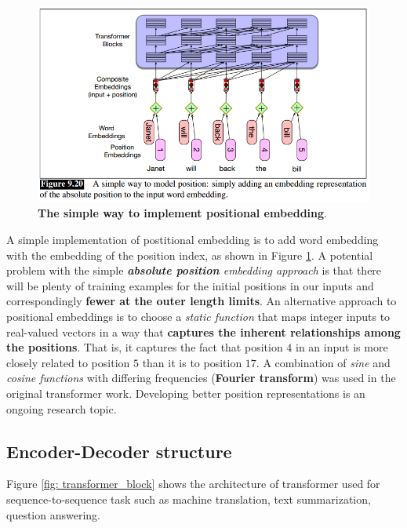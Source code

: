 \documentclass[11pt]{article}
\begin{document}
\begin{figure}
\begin{minipage}[t]{1\linewidth}
  \centering
  \centerline{\includegraphics[scale = 0.4]{pos_embedding.png}}
\end{minipage}
\caption{\footnotesize{\textbf{The simple way to implement positional embedding}.}}
\label{fig: pos_embedding}
\end{figure}

A simple implementation of postitional embedding is to add word embedding with the embedding of the position index, as shown in Figure \ref{fig: pos_embedding}. A potential problem with the simple \emph{\textbf{absolute position} embedding approach} is that there will be plenty of training examples for the initial positions in our inputs and
correspondingly \textbf{fewer at the outer length limits}. An alternative approach to positional embeddings is to choose a \emph{static function} that maps integer inputs to real-valued vectors in a way that \textbf{captures the inherent relationships among the positions}. That is, it captures the fact that position $4$ in an input is more closely related to position $5$ than it is to position $17$. A combination of \emph{sine} and \emph{cosine functions} with differing frequencies (\textbf{Fourier transform}) was used in the original transformer work. Developing better position representations is an ongoing research topic.


\subsection{Encoder-Decoder structure}

Figure \ref{fig: transformer_block} shows the architecture of transformer used for sequence-to-sequence task such as machine translation, text summarization, question answering. 
\end{document}
